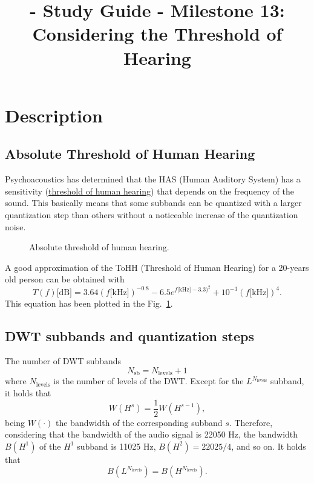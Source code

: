 
\title{\TM{} - Study Guide - Milestone 13: Considering the Threshold of Hearing}

\maketitle

\section{Description}

\subsection{Absolute Threshold of Human Hearing}
Psychoacoustics has determined that the HAS (Human Auditory System) has a
sensitivity
(\href{https://en.wikipedia.org/wiki/Absolute_threshold_of_hearing}{threshold
  of human hearing}) that depends on the frequency of the sound. This
basically means that some subbands can be quantized with a larger
quantization step than others without a noticeable increase of the
quantization noise.

\begin{figure}
  \centering
  \caption{Absolute threshold of human hearing.}
  \label{fig:ToHH}
\end{figure}

A good approximation of the ToHH (Threshold of Human Hearing) for a 20-years old person can be
obtained with~\cite{bosi2003intro}
\begin{equation}
  T(f)\text{[dB]} = 3.64(f\text{[kHz]})^{-0.8} - 6.5e^{f\text{[kHz]}-3.3)^2} + 10^{-3}(f\text{[kHz]})^4.
  \label{eq:ToHH}
\end{equation}
This equation has been plotted in the Fig.~\ref{fig:ToHH}.

\subsection{DWT subbands and quantization steps}
The number of DWT subbands
\begin{equation}
  N_{\text{sb}} = N_{\text{levels}} + 1
\end{equation}
where $N_{\text{levels}}$ is the number of levels of the DWT. Except for
the $L^{N_{\text{levels}}}$ subband, it holds that
\begin{equation}
  W(H^s) = \frac{1}{2}W(H^{s-1}),
\end{equation}
being $W(\cdot)$ the bandwidth of the corresponding
subband $s$. Therefore, considering that the bandwidth of the audio signal
is 22050 Hz, the bandwidth $B(H^1)$ of the $H^1$ subband is 11025 Hz,
$B(H^2)=22025/4$, and so on. It holds that
\begin{equation}
  B(L^{N_{\text{levels}}}) = B(H^{N_{\text{levels}}}).
\end{equation}

